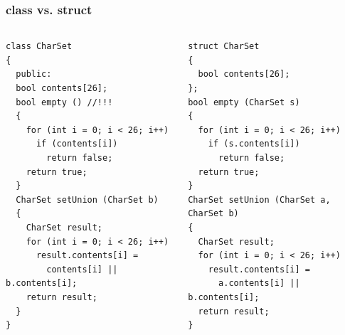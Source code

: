\documentclass{beamer}
\begin{document}
\begin{frame}[fragile]
\frametitle{class vs. struct}





\begin{columns}[t]
  \begin{column}{0.5\textwidth}
\begin{flushleft}
\begin{lstlisting}
class CharSet
{
  public:
  bool contents[26];
  bool empty () //!!!
  {
    for (int i = 0; i < 26; i++)
      if (contents[i])
        return false;
    return true;
  }
  CharSet setUnion (CharSet b)
  {
    CharSet result;
    for (int i = 0; i < 26; i++)
      result.contents[i] =
        contents[i] || b.contents[i];
    return result;
  }
}
\end{lstlisting}
\end{flushleft}
  \end{column}
  \begin{column}{0.5\textwidth}
\begin{flushleft}
\begin{lstlisting}
struct CharSet
{
  bool contents[26];
};
bool empty (CharSet s)
{
  for (int i = 0; i < 26; i++)
    if (s.contents[i])
      return false;
  return true;
}
CharSet setUnion (CharSet a, CharSet b)
{
  CharSet result;
  for (int i = 0; i < 26; i++)
    result.contents[i] =
      a.contents[i] || b.contents[i];
  return result;
}
\end{lstlisting}
\end{flushleft}

  \end{column}
\end{columns}


\end{frame}
\end{document}
